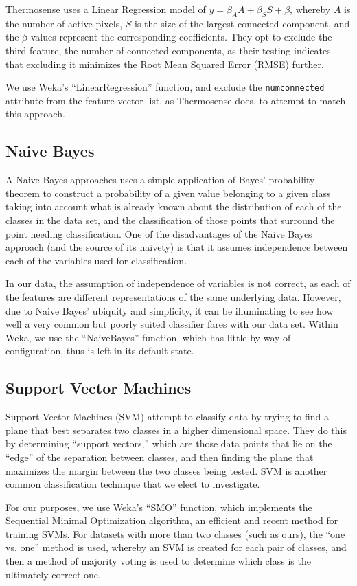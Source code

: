 \documentclass[../thesis/thesis.tex]{subfiles}
\begin{document}
Thermosense uses a Linear Regression model of $y = \beta_A A + \beta_S S + \beta $, whereby $A$ is the number of active pixels, $S$ is the size of the largest connected component, and the $\beta$ values represent the corresponding coefficients. They opt to exclude the third feature, the number of connected components, as their testing indicates that excluding it minimizes the Root Mean Squared Error (RMSE) further. 

We use Weka's ``LinearRegression'' function, and exclude the \texttt{numconnected} attribute from the feature vector list, as Thermosense does, to attempt to match this approach.

\subsection{Naive Bayes}
A Naive Bayes approaches uses a simple application of Bayes' probability theorem to construct a probability of a given value belonging to a given class taking into account what is already known about the distribution of each of the classes in the data set, and the classification of those points that surround the point needing classification. One of the disadvantages of the Naive Bayes approach (and the source of its naivety) is that it assumes independence between each of the variables used for classification.

In our data, the assumption of independence of variables is not correct, as each of the features are different representations of the same underlying data. However, due to Naive Bayes' ubiquity and simplicity, it can be illuminating to see how well a very common but poorly suited classifier fares with our data set. Within Weka, we use the ``NaiveBayes'' function, which has little by way of configuration, thus is left in its default state.

\subsection{Support Vector Machines}
Support Vector Machines (SVM) attempt to classify data by trying to find a plane that best separates two classes in a higher dimensional space. They do this by determining ``support vectors,'' which are those data points that lie on the ``edge'' of the separation between classes, and then finding the plane that maximizes the margin between the two classes being tested. SVM is another common classification technique that we elect to investigate.

For our purposes, we use Weka's ``SMO'' function, which implements the Sequential Minimal Optimization algorithm, an efficient and recent method for training SVMs. For datasets with more than two classes (such as ours), the ``one vs. one'' method is used, whereby an SVM is created for each pair of classes, and then a method of majority voting is used to determine which class is the ultimately correct one. %
\end{document}
